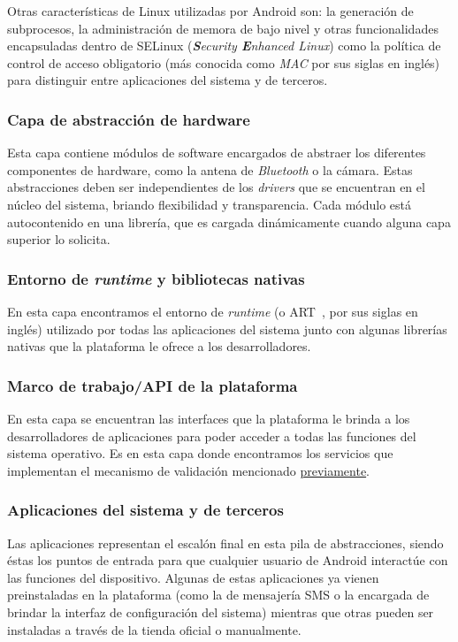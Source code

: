 Otras características de Linux utilizadas por Android son: la generación de subprocesos, la
administración de memora de bajo nivel y otras funcionalidades encapsuladas dentro de SELinux
(\textit{\textbf{S}ecurity \textbf{E}nhanced Linux}) como la política de control de acceso
obligatorio (más conocida como \textit{MAC} por sus siglas en inglés) para distinguir entre
aplicaciones del sistema y de terceros.

\subsubsection*{Capa de abstracción de hardware}
Esta capa contiene módulos de software encargados de abstraer los diferentes componentes de
hardware, como la antena de \textit{Bluetooth} o la cámara. Estas abstracciones deben ser
independientes de los \textit{drivers} que se encuentran en el núcleo del sistema, briando
flexibilidad y transparencia. Cada módulo está autocontenido en una librería, que es cargada
dinámicamente cuando alguna capa superior lo solicita.

\subsubsection*{Entorno de \textit{runtime} y bibliotecas nativas} En esta capa encontramos el
entorno de \textit{runtime} (o ART~\cite{art}, por sus siglas en inglés) utilizado por todas las
aplicaciones del sistema junto con algunas librerías nativas que la plataforma le ofrece a los
desarrolladores.

\subsubsection*{Marco de trabajo/API de la plataforma}
En esta capa se encuentran las interfaces que la plataforma le brinda a los desarrolladores de
aplicaciones para poder acceder a todas las funciones del sistema operativo. Es en esta capa donde
encontramos los servicios que implementan el mecanismo de validación mencionado
\hyperref[section:architecture:kernel]{previamente}.

\subsubsection*{Aplicaciones del sistema y de terceros}
Las aplicaciones representan el escalón final en esta pila de abstracciones, siendo éstas los puntos
de entrada para que cualquier usuario de Android interactúe con las funciones del dispositivo.
Algunas de estas aplicaciones ya vienen preinstaladas en la plataforma (como la de mensajería SMS o
la encargada de brindar la interfaz de configuración del sistema) mientras que otras pueden ser
instaladas a través de la tienda oficial o manualmente.


